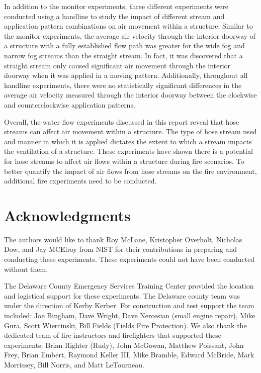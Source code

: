 \documentclass[12pt,oneside]{book}
\begin{document}
In addition to the monitor experiments, three different experiments were conducted using a handline to study the impact of different stream and application pattern combinations on air movement within a structure. Similar to the monitor experiments, the average air velocity through the interior doorway of a structure with a fully established flow path was greater for the wide fog and narrow fog streams than the straight stream. In fact, it was discovered that a straight stream only caused significant air movement through the interior doorway when it was applied in a moving pattern. Additionally, throughout all handline experiments, there were no statistically significant differences in the average air velocity measured through the interior doorway between the clockwise and counterclockwise application patterns.

Overall, the water flow experiments discussed in this report reveal that hose streams can affect air movement within a structure. The type of hose stream used and manner in which it is applied dictates the extent to which a stream impacts the ventilation of a structure. These experiments have shown there is a potential for hose streams to affect air flows within a structure during fire scenarios. To better quantify the impact of air flows from hose streams on the fire environment, additional fire experiments need to be conducted.

\chapter{Acknowledgments}
\label{chap:acknowledgments}

The authors would like to thank Roy McLane, Kristopher Overholt, Nicholas Dow, and Jay MCElroy from NIST for their contributions in preparing and conducting these experiments.  These experiments could not have been conducted without them.  

The Delaware County Emergency Services Training Center provided the location and logistical support for these experiments.  The Delaware county team was under the direction of Kerby Kerber.  For construction and test support the team included: Joe Bingham, Dave Wright, Dave Nercesian (small engine repair), Mike Gura, Scott Wiercinski, Bill Fields (Fields Fire Protection).  We also thank the dedicated team of fire instructors and firefighters that supported these experiments; Brian Righter (Rudy), John McGowan, Matthew Poissant, John Frey, Brian Embert, Raymond Keller III, Mike Bramble, Edward McBride, Mark Morrissey, Bill Norris, and Matt LeTourneau.
\end{document}
